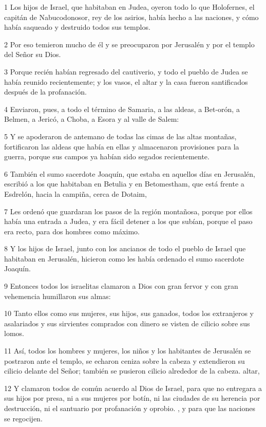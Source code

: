 \par 1 Los hijos de Israel, que habitaban en Judea, oyeron todo lo que Holofernes, el capitán de Nabucodonosor, rey de los asirios, había hecho a las naciones, y cómo había saqueado y destruido todos sus templos.
\par 2 Por eso temieron mucho de él y se preocuparon por Jerusalén y por el templo del Señor su Dios.
\par 3 Porque recién habían regresado del cautiverio, y todo el pueblo de Judea se había reunido recientemente; y los vasos, el altar y la casa fueron santificados después de la profanación.
\par 4 Enviaron, pues, a todo el término de Samaria, a las aldeas, a Bet-orón, a Belmen, a Jericó, a Choba, a Esora y al valle de Salem:
\par 5 Y se apoderaron de antemano de todas las cimas de las altas montañas, fortificaron las aldeas que había en ellas y almacenaron provisiones para la guerra, porque sus campos ya habían sido segados recientemente.
\par 6 También el sumo sacerdote Joaquín, que estaba en aquellos días en Jerusalén, escribió a los que habitaban en Betulia y en Betomestham, que está frente a Esdrelón, hacia la campiña, cerca de Dotaim,
\par 7 Les ordenó que guardaran los pasos de la región montañosa, porque por ellos había una entrada a Judea, y era fácil detener a los que subían, porque el paso era recto, para dos hombres como máximo.
\par 8 Y los hijos de Israel, junto con los ancianos de todo el pueblo de Israel que habitaban en Jerusalén, hicieron como les había ordenado el sumo sacerdote Joaquín.
\par 9 Entonces todos los israelitas clamaron a Dios con gran fervor y con gran vehemencia humillaron sus almas:
\par 10 Tanto ellos como sus mujeres, sus hijos, sus ganados, todos los extranjeros y asalariados y sus sirvientes comprados con dinero se visten de cilicio sobre sus lomos.
\par 11 Así, todos los hombres y mujeres, los niños y los habitantes de Jerusalén se postraron ante el templo, se echaron ceniza sobre la cabeza y extendieron su cilicio delante del Señor; también se pusieron cilicio alrededor de la cabeza. altar,
\par 12 Y clamaron todos de común acuerdo al Dios de Israel, para que no entregara a sus hijos por presa, ni a sus mujeres por botín, ni las ciudades de su herencia por destrucción, ni el santuario por profanación y oprobio. , y para que las naciones se regocijen.
